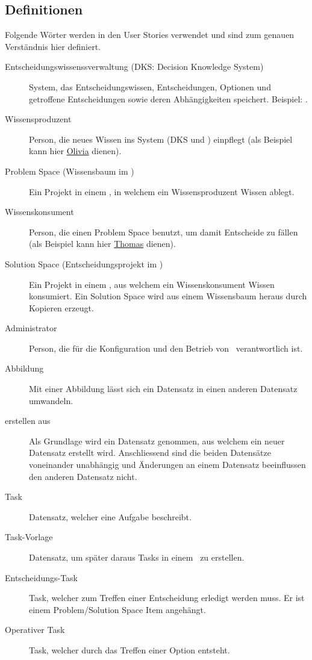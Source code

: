 	\subsection{Definitionen}\label{userstoryDefinitions}
		Folgende Wörter werden in den User Stories verwendet und sind zum genauen Verständnis hier definiert.
		\begin{description}			
			\item[Entscheidungswissenssverwaltung (DKS: Decision Knowledge System)] System, 
				das Entscheidungswissen, Entscheidungen, Optionen und getroffene Entscheidungen 
				sowie deren Abhängigkeiten speichert. Beispiel: \cdar.
			\item[Wissensproduzent] Person, die neues Wissen ins System (DKS und \eeppi)
				 einpflegt (als Beispiel kann hier \hyperref[olivia]{Olivia} dienen).
			\item[Problem Space (Wissensbaum im \cdar)] Ein Projekt in einem \dks, 
				in welchem ein Wissensproduzent Wissen ablegt.
			\item[Wissenskonsument] Person, die einen Problem Space benutzt,
				 um damit Entscheide zu fällen 
				 (als Beispiel kann hier \hyperref[thomas]{Thomas} dienen).
			\item[Solution Space (Entscheidungsprojekt im \cdar)] Ein Projekt in einem \dks, 
				aus welchem ein Wissenskonsument Wissen konsumiert.
				Ein Solution Space wird aus einem Wissensbaum heraus durch Kopieren erzeugt.
			\item[Administrator] Person, die für die Konfiguration 
				und den Betrieb von \eeppi\ verantwortlich ist.
			\item[Abbildung] Mit einer Abbildung lässt sich ein Datensatz 
				in einen anderen Datensatz umwandeln.
			\item[erstellen aus] Als Grundlage wird ein Datensatz genommen, 
				aus welchem ein neuer Datensatz erstellt wird.
				Anschliessend sind die beiden Datensätze voneinander unabhängig 
				und Änderungen an einem Datensatz beeinflussen den anderen Datensatz nicht.
			\item[Task] Datensatz, welcher eine Aufgabe beschreibt.
			\item[Task-Vorlage] Datensatz, um später daraus Tasks in einem \ppt\ zu erstellen.
			\item[Entscheidungs-Task] Task, 
				welcher zum Treffen einer Entscheidung erledigt werden muss.
				Er ist einem Problem/Solution Space Item angehängt.
			\item[Operativer Task] Task, welcher durch das Treffen einer Option entsteht.

\end{description}
